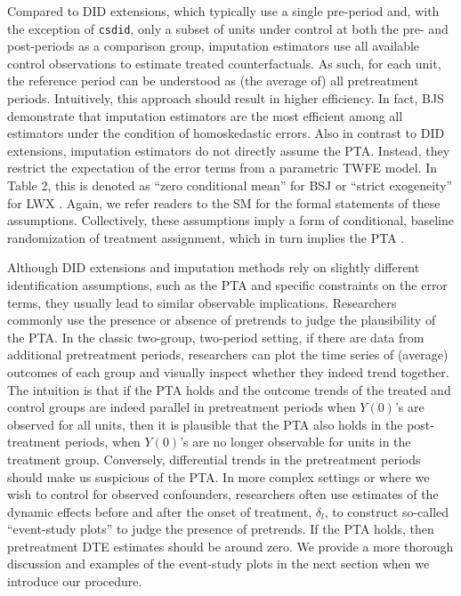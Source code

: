 \documentclass[12pt]{article}
\begin{document}
Compared to DID extensions, which typically use a single pre-period and, with
the exception of \texttt{csdid}, only a subset of units under control at both the pre- and post-periods as a comparison group, imputation estimators use all available control observations to estimate treated counterfactuals. As such, for each unit, the reference period can be understood as (the average of) all pretreatment periods. Intuitively, this approach should result in higher efficiency. In fact, BJS \citeyearpar{BJS2021} demonstrate that imputation estimators are the most efficient among all estimators under the condition of homoskedastic errors. Also in contrast to DID extensions, imputation estimators do not directly assume the PTA. Instead, they restrict the expectation of the error terms from a parametric TWFE model. In Table 2, this is denoted as ``zero conditional mean'' for BSJ \citeyearpar{BJS2021} or ``strict exogeneity'' for LWX \citeyearpar{LWX2022}. Again, we refer readers to the SM for the formal statements of these assumptions. Collectively, these assumptions imply a form of conditional, baseline randomization of treatment assignment, which in turn implies the PTA \citep[e.g.,][]{Blackwell2018-br}.



Although DID extensions and imputation methods rely on slightly different identification assumptions, such as the PTA and specific constraints on the error terms, they usually lead to similar observable implications. Researchers commonly use the presence or absence of pretrends to judge the plausibility of the PTA. In the classic two-group, two-period setting, if there are data from additional pretreatment periods, researchers can plot the time series of (average) outcomes of each group and visually inspect whether they indeed trend together. The intuition is that if the PTA holds and the outcome trends of the treated and control groups are indeed parallel in pretreatment periods when $Y(0)$'s are observed for all units, then it is plausible that the PTA also holds in the post-treatment periods, when $Y(0)$'s are no longer observable for units in the treatment group. Conversely, differential trends in the pretreatment periods should make us suspicious of the PTA. In more complex settings or where we wish to control for observed confounders, researchers often use estimates of the dynamic effects before and after the onset of treatment, $\delta_l$, to construct so-called ``event-study plots'' to judge the presence of pretrends. If the PTA holds, then pretreatment DTE estimates should be around zero. We provide a more thorough discussion and examples of the event-study plots in the next section when we introduce our procedure. 
\end{document}
